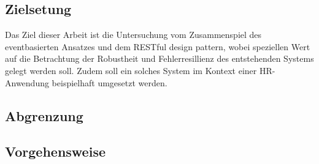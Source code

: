 
\subsection{Zielsetung}
Das Ziel dieser Arbeit ist die Untersuchung vom Zusammenspiel des eventbasierten Ansatzes und dem RESTful design pattern, wobei speziellen Wert auf die Betrachtung der Robustheit und Fehlerresillienz des entstehenden Systems gelegt werden soll. Zudem soll ein solches System im Kontext einer HR-Anwendung beispielhaft umgesetzt werden.
\subsection{Abgrenzung}
\subsection{Vorgehensweise}